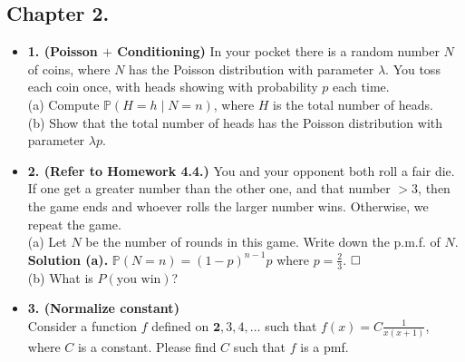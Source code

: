 \documentclass[12pt]{article}
\begin{document}
\subsection*{Chapter 2.}
\begin{itemize}
    \item \textbf{1. (Poisson $+$ Conditioning)} In your pocket there is a random number $N$ of coins, where $N$ has the Poisson distribution with parameter $\lambda$. You toss each coin once, with heads showing with probability $p$ each time.\\
    (a) Compute $\mathbb{P}(H=h\mid N=n)$, where $H$ is the total number of heads. \\
    (b) Show that the total number of heads has the Poisson distribution with parameter $\lambda p$.
    \item \textbf{2. (Refer to Homework 4.4.)} You and your opponent both roll a fair die. If one get a greater number than the other one, and that number $>3$, then the game ends and whoever rolls the larger number wins. Otherwise, we repeat the game.\\
    (a) Let $N$ be the number of rounds in this game. Write down the p.m.f. of $N$. \\
    \textbf{Solution (a).} $\mathbb{P}(N=n)=(1-p)^{n-1}p$ where $p=\frac{2}{3}$.
    $\hspace{\fill}\square$\\
    (b) What is $P(\text{you win})$? 
    \item \textbf{3. (Normalize constant)}\\
Consider a function \(f\) defined on \(\textbf{2},3,4,\dots\) such that \(f(x) = C \frac{1}{x(x+1)}\), where \(C\) is a constant. Please find \(C\) such that \(f\) is a pmf. 


\end{itemize}
\end{document}
